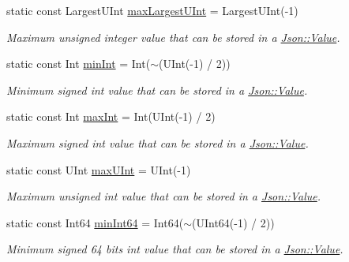 \begin{DoxyCompactItemize}
static const Largest\+U\+Int \hyperlink{class_json_1_1_value_a8ddb32d9d55fa5323ae5135639dc2e31}{max\+Largest\+U\+Int} = Largest\+U\+Int(-\/1)
\begin{DoxyCompactList}\small\item\em Maximum unsigned integer value that can be stored in a \hyperlink{class_json_1_1_value}{Json\+::\+Value}. \end{DoxyCompactList}\item 
\mbox{\label{class_json_1_1_value_a7df8a39e2502b8c92a6a41e3d752d2c8}} 
static const Int \hyperlink{class_json_1_1_value_a7df8a39e2502b8c92a6a41e3d752d2c8}{min\+Int} = Int($\sim$(U\+Int(-\/1) / 2))
\begin{DoxyCompactList}\small\item\em Minimum signed int value that can be stored in a \hyperlink{class_json_1_1_value}{Json\+::\+Value}. \end{DoxyCompactList}\item 
\mbox{\label{class_json_1_1_value_a978c799a8af3114ef7dab6fd0a310a1b}} 
static const Int \hyperlink{class_json_1_1_value_a978c799a8af3114ef7dab6fd0a310a1b}{max\+Int} = Int(U\+Int(-\/1) / 2)
\begin{DoxyCompactList}\small\item\em Maximum signed int value that can be stored in a \hyperlink{class_json_1_1_value}{Json\+::\+Value}. \end{DoxyCompactList}\item 
\mbox{\label{class_json_1_1_value_ac79e63ee68d3aa914bfd6988be669b87}} 
static const U\+Int \hyperlink{class_json_1_1_value_ac79e63ee68d3aa914bfd6988be669b87}{max\+U\+Int} = U\+Int(-\/1)
\begin{DoxyCompactList}\small\item\em Maximum unsigned int value that can be stored in a \hyperlink{class_json_1_1_value}{Json\+::\+Value}. \end{DoxyCompactList}\item 
\mbox{\label{class_json_1_1_value_a815ef899bc312c93bc426511acfe31a7}} 
static const Int64 \hyperlink{class_json_1_1_value_a815ef899bc312c93bc426511acfe31a7}{min\+Int64} = Int64($\sim$(U\+Int64(-\/1) / 2))
\begin{DoxyCompactList}\small\item\em Minimum signed 64 bits int value that can be stored in a \hyperlink{class_json_1_1_value}{Json\+::\+Value}. \end{DoxyCompactList}\item 

\end{DoxyCompactItemize}
